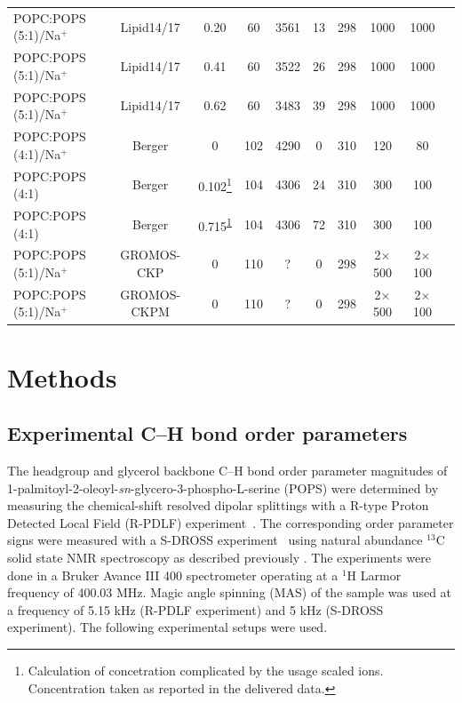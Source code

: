 \documentclass[aps,prl,superscriptaddress,twocolumn]{revtex4}
\begin{document}
\begin{table}[tb]
\begin{tabular}{lccccccccc}
POPC:POPS (5:1)/Na$^{+}$  & Lipid14/17 \cite{dickson14,gould18,smith94,dang06}  & 0.20  & 60 & 3561  & 13  & 298  & 1000  & 1000  & \cite{lipid17_cacl_series} \tabularnewline
POPC:POPS (5:1)/Na$^{+}$  & Lipid14/17 \cite{dickson14,gould18,smith94,dang06}  & 0.41  & 60 & 3522  & 26  & 298  & 1000  & 1000  & \cite{lipid17_cacl_series} \tabularnewline
POPC:POPS (5:1)/Na$^{+}$  & Lipid14/17 \cite{dickson14,gould18,smith94,dang06}  & 0.62  & 60 & 3483  & 39  & 298  & 1000  & 1000  & \cite{lipid17_cacl_series} \tabularnewline
\hline 
POPC:POPS (4:1)/Na$^{+}$  & Berger \cite{tieleman99,mukhopadhyay04}  & 0  & 102 & 4290  & 0  & 310  & 120  & 80  & \cite{bergerPOPSPOPC4:1mixtureT310K} \tabularnewline
POPC:POPS (4:1)  & Berger \cite{tieleman99,mukhopadhyay04}  & 0.102\footnote{\label{noteBerger}Calculation of concetration complicated by the
usage scaled ions. Concentration taken as reported in the delivered
data.}  & 104  & 4306  & 24  & 310  & 300  & 100  & \cite{POPCpopsBERGERwith102mMCa} \tabularnewline
POPC:POPS (4:1)  & Berger \cite{tieleman99,mukhopadhyay04}  & 0.715\textsuperscript{\ref{noteBerger}}  & 104 & 4306  & 72  & 310  & 300  & 100  & \cite{POPCpopsBERGERwith715mMCa} \tabularnewline
\hline 
POPC:POPS (5:1)/Na$^{+}$  & GROMOS-CKP \cite{??}  & 0  & 110 & ?  & 0  & 298  & 2$\times$500  & 2$\times$100  & \cite{POPCpopsGROMOSCKPwithNa} \tabularnewline
POPC:POPS (5:1)/Na$^{+}$  & GROMOS-CKPM \cite{??}  & 0  & 110 & ?  & 0  & 298  & 2$\times$500  & 2$\times$100  & \cite{POPCpopsGROMOSCKPMwithNa} \tabularnewline
\end{tabular}

\end{table}



\section{Methods}

\subsection{Experimental C--H bond order parameters}%

The headgroup and glycerol backbone C--H bond order parameter magnitudes of 1-palmitoyl-2-oleoyl-{\it sn}-glycero-3-phospho-L-serine (POPS)
were determined by measuring the chemical-shift resolved dipolar splittings
with a R-type Proton Detected Local Field (R-PDLF) experiment~\cite{dvinskikh04}.
The corresponding order parameter signs were measured with a S-DROSS experiment~\cite{gross97}
using natural abundance $^{13}$C solid state NMR spectroscopy as described previously \cite{ferreira13,ferreira16}.
The experiments were done in a Bruker Avance III 400 spectrometer operating at a $^1$H Larmor frequency of 400.03 MHz.
Magic angle spinning (MAS) of the sample was used at a frequency of 5.15 kHz (R-PDLF experiment) and 5 kHz (S-DROSS experiment).
The following experimental setups were used.
\end{document}
